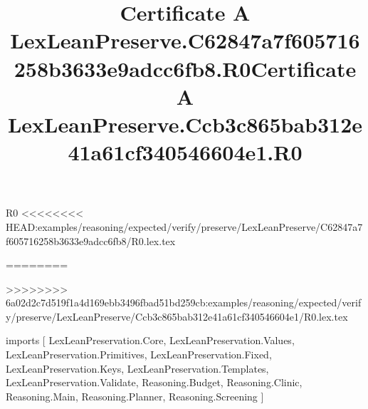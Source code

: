 \begin{lexlean}{R0}
<<<<<<<< HEAD:examples/reasoning/expected/verify/preserve/LexLeanPreserve/C62847a7f605716258b3633e9adcc6fb8/R0.lex.tex
\title{Certificate A LexLeanPreserve.C62847a7f605716258b3633e9adcc6fb8.R0}
========
\title{Certificate A LexLeanPreserve.Ccb3c865bab312e41a61cf340546604e1.R0}
>>>>>>>> 6a02d2c7d519f1a4d169ebb3496fbad51bd259cb:examples/reasoning/expected/verify/preserve/LexLeanPreserve/Ccb3c865bab312e41a61cf340546604e1/R0.lex.tex
\begin{coremodule}
imports [
  LexLeanPreservation.Core,
  LexLeanPreservation.Values,
  LexLeanPreservation.Primitives,
  LexLeanPreservation.Fixed,
  LexLeanPreservation.Keys,
  LexLeanPreservation.Templates,
  LexLeanPreservation.Validate,
  Reasoning.Budget,
  Reasoning.Clinic,
  Reasoning.Main,
  Reasoning.Planner,
  Reasoning.Screening
]


\end{coremodule}
\end{lexlean}
